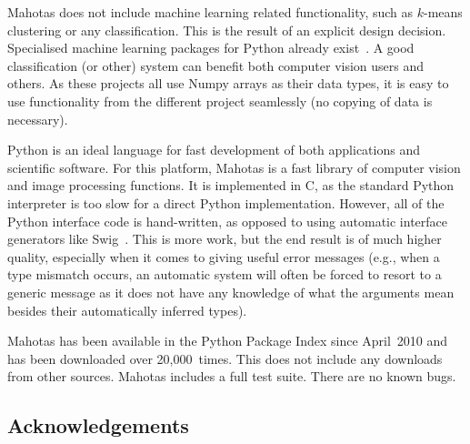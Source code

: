 \documentclass{article}
\newcommand*{\cpp}{{C\nolinebreak[4]\hspace{-.05em}\raisebox{.4ex}{\tiny\textbf{++}}}}
\begin{document}
Mahotas does not include machine learning related functionality, such as
$k$-means clustering or any classification. This is the result of an explicit
design decision. Specialised machine learning packages for Python already
exist~\citep{Pedregosa:2011:SML:2078183.2078195,springerlink:10.1007/978-3-540-30116-5_58,Schaul:2010:PYB:1756006.1756030,Sonnenburg:2010:SML:1756006.1859911}.
A good classification (or other) system can benefit both computer vision users
and others. As these projects all use Numpy arrays as their data types, it is
easy to use functionality from the different project seamlessly (no copying of
data is necessary).

Python is an ideal language for fast development of both applications and
scientific software. For this platform, Mahotas is a fast library of computer
vision and image processing functions. It is implemented in \cpp{}, as the
standard Python interpreter is too slow for a direct Python implementation.
However, all of the Python interface code is hand-written, as opposed to using
automatic interface generators like Swig~\cite{Beazley2003599}. This is more
work, but the end result is of much higher quality, especially when it comes to
giving useful error messages (e.g., when a type mismatch occurs, an automatic
system will often be forced to resort to a generic message as it does not have
any knowledge of what the arguments mean besides their automatically inferred
types).

Mahotas has been available in the Python Package Index since April~2010 and has
been downloaded over 20,000~times. This does not include any downloads from
other sources. Mahotas includes a full test suite. There are no known bugs.

\subsection*{Acknowledgements}
\end{document}
